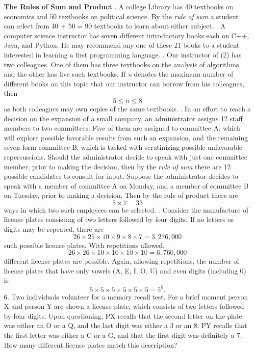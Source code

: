 \documentclass{article}
\begin{document}
{\begin{flushleft}{\bf{The Rules of Sum and Product}}
\linebreak
{}. A college Library has 40 textbooks on economics and 50 textbooks on political science. By the {\it{rule of sum}} a student can select from 40 + 50 = 90 textbooks to learn about either subject.
\linebreak 
{}. A computer science instructor has seven different introductory books each on C++, Java, and Python. He may recommend any one of these 21 books to a student interested in learning a first programming language. 
\linebreak
{}. Our instructor of  (2) has two colleagues. One of them has three textbooks on the analysis of algorithms, and the other has five such textbooks. If {\it{n}} denotes the maximum number of different books on this topic that our instructor can borrow from his colleagues, then \[5 \leq n \leq 8 \] as both colleagues may own copies of the same textbooks.
\linebreak
{}. In an effort to reach a decision on the expansion of a small company, an administrator assigns 12 staff members to two committees. Five of them are assigned to committee A, which will explore possible favorable results from such an expansion, and the remaining seven form committee B, which is tasked with scrutinizing possible unfavorable repercussions. Should the administrator decide to speak with just one committee member, prior to making the decision, then by the {\it{rule of sum}} there are 12 possible candidates to consult for input. Suppose the administrator decides to speak with a member of committee A on Monday, and a member of committee B on Tuesday, prior to making a decision. Then by the rule of product there are \[ 5 \times 7 = 35 \] ways in which two such employees can be selected.
\linebreak
{}. Consider the manufacture of license plates consisting of two letters followed by four digits. If no letters or digits may be repeated, there are \[ 26 \times 25 \times 10 \times 9 \times 8 \times 7 = 3, 276, 000 \] such possible license plates.
With repetitions allowed, \[ 26 \times 26 \times 10 \times 10 \times 10 \times 10 = 6, 760, 000 \] different license plates are possible.
\linebreak
\linebreak
Again, allowing repetitions, the number of license plates that have only vowels (A, E, I, O, U) and even digits (including 0) is \[ 5 \times 5 \times 5 \times 5 \times 5 \times 5 = 5^6. \]
6. Two individuals volunteer for a memory recall test. For a brief moment person X and person Y are shown a license plate, which consists of two letters followed by four digits. Upon questioning, PX recalls that the second letter on the plate was either an O or a Q, and the last digit was either a 3 or an 8. PY recalls that the first letter was either a C or a G, and that the first digit was definitely a 7. How many different license plates match this description? 


\end{flushleft}}
\end{document}
